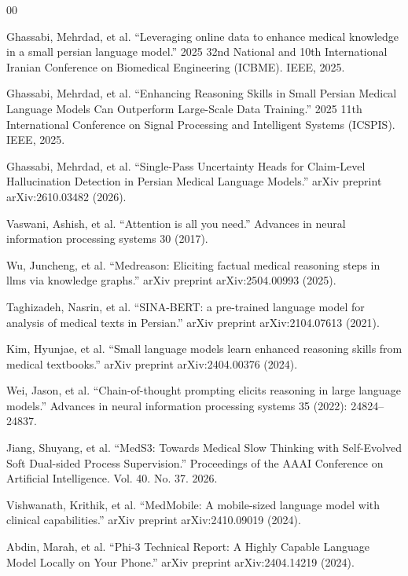 \documentclass[manuscript,screen,review]{acmart}
\begin{document}
\begin{thebibliography}{00}

Ghassabi, Mehrdad, et al. ``Leveraging online data to enhance medical knowledge in a small persian language model.'' 2025 32nd National and 10th International Iranian Conference on Biomedical Engineering (ICBME). IEEE, 2025.

Ghassabi, Mehrdad, et al. ``Enhancing Reasoning Skills in Small Persian Medical Language Models Can Outperform Large-Scale Data Training.'' 2025 11th International Conference on Signal Processing and Intelligent Systems (ICSPIS). IEEE, 2025.

Ghassabi, Mehrdad, et al. ``Single-Pass Uncertainty Heads for Claim-Level Hallucination Detection in Persian Medical Language Models.'' arXiv preprint arXiv:2610.03482 (2026).

Vaswani, Ashish, et al. ``Attention is all you need.'' Advances in neural information processing systems 30 (2017).

Wu, Juncheng, et al. ``Medreason: Eliciting factual medical reasoning steps in llms via knowledge graphs.'' arXiv preprint arXiv:2504.00993 (2025).

Taghizadeh, Nasrin, et al. ``SINA-BERT: a pre-trained language model for analysis of medical texts in Persian.'' arXiv preprint arXiv:2104.07613 (2021).

Kim, Hyunjae, et al. ``Small language models learn enhanced reasoning skills from medical textbooks.'' arXiv preprint arXiv:2404.00376 (2024).

Wei, Jason, et al. ``Chain-of-thought prompting elicits reasoning in large language models.'' Advances in neural information processing systems 35 (2022): 24824--24837.

Jiang, Shuyang, et al. ``MedS3: Towards Medical Slow Thinking with Self-Evolved Soft Dual-sided Process Supervision.'' Proceedings of the AAAI Conference on Artificial Intelligence. Vol. 40. No. 37. 2026.

Vishwanath, Krithik, et al. ``MedMobile: A mobile-sized language model with clinical capabilities.'' arXiv preprint arXiv:2410.09019 (2024).

Abdin, Marah, et al. ``Phi-3 Technical Report: A Highly Capable Language Model Locally on Your Phone.'' arXiv preprint arXiv:2404.14219 (2024).


\end{thebibliography}
\end{document}
